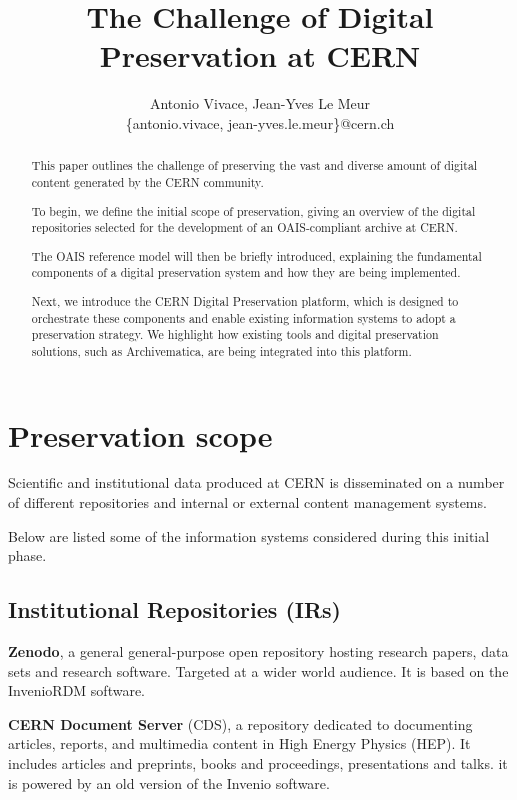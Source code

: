 \documentclass[11pt]{IEEEtran}
\title{ The Challenge of Digital Preservation at CERN }
\author{Antonio Vivace, Jean-Yves Le Meur\\
    \{antonio.vivace, jean-yves.le.meur\}@cern.ch}
\begin{document}
\maketitle

\begin{abstract}
This paper outlines the challenge of preserving the vast and diverse amount of digital content generated by the CERN community.

To begin, we define the initial scope of preservation, giving an overview of the digital repositories selected for the development of an OAIS-compliant archive at CERN.

The OAIS reference model will then be briefly introduced, explaining the fundamental components of a digital preservation system and how they are being implemented.

Next, we introduce the CERN Digital Preservation platform, which is designed to orchestrate these components and enable existing information systems to adopt a preservation strategy. We highlight how existing tools and digital preservation solutions, such as Archivematica, are being integrated into this platform.

\end{abstract}

\section{Preservation scope}

Scientific and institutional data produced at CERN is disseminated on a number of different repositories and internal or external content management systems.

Below are listed some of the information systems considered during this initial phase.

\subsection{Institutional Repositories (IRs)} 

\textbf{Zenodo}, a general general-purpose open repository hosting research papers, data sets and research software. Targeted at a wider world audience. It is based on the InvenioRDM \cite{InvenioRDMinveniosoftwareorg-2023-03-16} software.

\textbf{CERN Document Server} (CDS), a repository dedicated to documenting articles, reports, and multimedia content in High Energy Physics (HEP). It includes articles and preprints, books and proceedings, presentations and talks. it is powered by an old version of the Invenio software.
\end{document}
